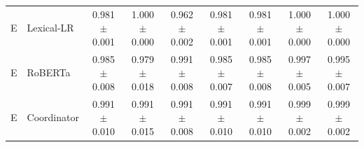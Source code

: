 \begin{table}[t]
\begin{tabular}{llccccccc}
E & Lexical-LR & 0.981 $\pm$ 0.001 & 1.000 $\pm$ 0.000 & 0.962 $\pm$ 0.002 & 0.981 $\pm$ 0.001 & 0.981 $\pm$ 0.001 & 1.000 $\pm$ 0.000 & 1.000 $\pm$ 0.000 \\
E & RoBERTa & 0.985 $\pm$ 0.008 & 0.979 $\pm$ 0.018 & 0.991 $\pm$ 0.008 & 0.985 $\pm$ 0.007 & 0.985 $\pm$ 0.008 & 0.997 $\pm$ 0.005 & 0.995 $\pm$ 0.007 \\
E & Coordinator & 0.991 $\pm$ 0.010 & 0.991 $\pm$ 0.015 & 0.991 $\pm$ 0.008 & 0.991 $\pm$ 0.010 & 0.991 $\pm$ 0.010 & 0.999 $\pm$ 0.002 & 0.999 $\pm$ 0.002 \\
\bottomrule
\end{tabular}
\end{table}
